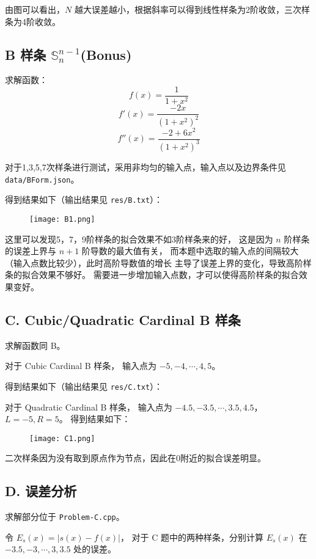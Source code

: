 \documentclass[lang=cn,a4paper,newtx,bibend=bibtex]{elegantpaper}
\newcommand{\SBB}{\mathbb{S}}
\begin{document}
由图可以看出，$N$ 越大误差越小，根据斜率可以得到线性样条为2阶收敛，三次样条为4阶收敛。

\subsection{B 样条 $\SBB_n^{n-1}$(Bonus)}

求解函数：
\[f(x) = \dfrac{1}{1+x^2}\]
\[f'(x) = \dfrac{-2x}{(1+x^2)^2}\]
\[f''(x) = \dfrac{-2+6x^2}{(1+x^2)^3}\]

对于1,3,5,7次样条进行测试，采用非均匀的输入点，输入点以及边界条件见 \lstinline{data/BForm.json}。

得到结果如下（输出结果见 \lstinline{res/B.txt}）：

\begin{figure}[H]
  \centering
  \texttt{[image: B1.png]}
\end{figure}

这里可以发现5，7，9阶样条的拟合效果不如3阶样条来的好，
这是因为 $n$ 阶样条的误差上界与 $n+1$ 阶导数的最大值有关，
而本题中选取的输入点的间隔较大（输入点数比较少），此时高阶导数值的增长
主导了误差上界的变化，导致高阶样条的拟合效果不够好。
需要进一步增加输入点数，才可以使得高阶样条的拟合效果变好。


\subsection{C. Cubic/Quadratic Cardinal B 样条}

求解函数同 B。

对于 Cubic Cardinal B 样条，
输入点为 $-5, -4, \cdots, 4, 5$。

得到结果如下（输出结果见 \lstinline{res/C.txt}）：

对于 Quadratic Cardinal B 样条， 
输入点为 $-4.5, -3.5, \cdots, 3.5, 4.5$，$L = -5, R = 5$。
得到结果如下：

\begin{figure}[H]
  \centering
  \texttt{[image: C1.png]}
\end{figure}

二次样条因为没有取到原点作为节点，因此在0附近的拟合误差明显。


\subsection{D. 误差分析}

求解部分位于 \lstinline{Problem-C.cpp}。

令 $E_s(x) = | s(x) - f(x) |$，
对于 C 题中的两种样条，分别计算 $E_s(x)$ 在
$-3.5, -3, \cdots, 3, 3.5$ 处的误差。
\end{document}
